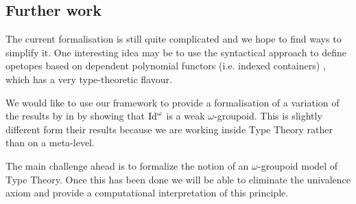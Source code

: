 \subsection{Further work}
The current formalisation is still
quite complicated and we hope to find ways to simplify it. One interesting
idea may be to use the syntactical approach to define opetopes based on
dependent polynomial functors (i.e. indexed containers) \cite{opetopes},
which has a very type-theoretic flavour.  

We would like to use our framework to provide a formalisation of a
variation of the results by in
\cite{lumsdaine10:weak-o-categories,berg08:types-are} by showing that
$\mathrm{Id}^\omega$ is a weak $\omega$-groupoid. This is slightly different form
their results because we are working inside Type Theory rather than on
a meta-level.

The main challenge ahead is to formalize the notion of an
$\omega$-groupoid model of Type Theory. Once this has been done we
will be able to eliminate the univalence axiom and provide a
computational interpretation of this principle.




